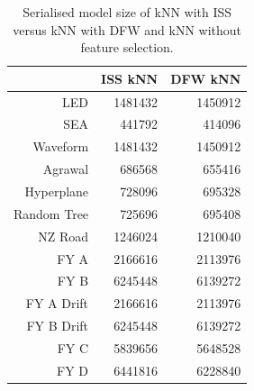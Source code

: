 \begin{table}[h]
\centering
\begin{tabular}{r|rr}

            & ISS kNN & DFW kNN \\ \hline
LED         & 1481432          & 1450912    \\
SEA         & 441792           & 414096     \\
Waveform    & 1481432          & 1450912    \\
Agrawal     & 686568           & 655416     \\
Hyperplane  & 728096           & 695328     \\
Random Tree & 725696           & 695408     \\
NZ Road     & 1246024          & 1210040    \\
FY A        & 2166616          & 2113976    \\
FY B        & 6245448          & 6139272    \\
FY A Drift  & 2166616          & 2113976    \\
FY B Drift  & 6245448          & 6139272    \\
FY C        & 5839656          & 5648528    \\
FY D        & 6441816          & 6228840 

\end{tabular}
\caption{Serialised model size of kNN with ISS versus kNN with DFW and kNN without feature selection.}
\label{Table:Mem_comparason}
\end{table}


